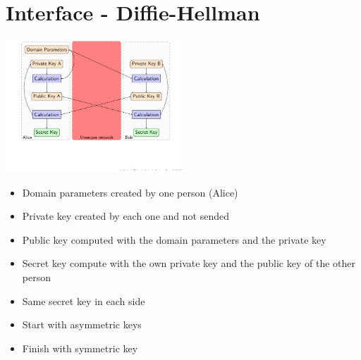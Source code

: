 \section{Interface - Diffie-Hellman}

\begin{frame}

\includegraphics[trim=0.5cm 4cm 14cm 0cm,
height=5cm]{figures/diffie_hellman.pdf}

\end{frame}


\begin{frame}

\begin{itemize}
  \item Domain parameters created by one person (Alice)
  \item Private key created by each one and not sended
  \item Public key computed with the domain parameters and the private key
  \item Secret key compute with the own private key and the public key of the
  other person
  \item Same secret key in each side
\end{itemize}  

\vspace{0.25cm}

\begin{itemize}
  \item Start with asymmetric keys
  \item Finish with symmetric key
\end{itemize}



\end{frame}
